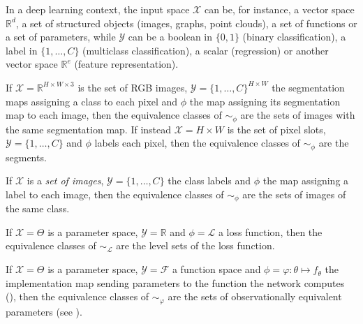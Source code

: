 \documentclass[mathematics,review,submit,moreauthors]{Definitions/mdpi}
\begin{document}
In a deep learning context, the input space $\mathcal{X}$ can be, for instance, a vector space $\mathbb{R}^d$, a set of structured objects (images, graphs, point clouds), a set of functions or a set of parameters, while $\mathcal{Y}$ can be a boolean in $\{0,1\}$ (binary classification), a label in $\{1,\dots,C\}$ (multiclass classification), a scalar (regression) or another vector space $\mathbb{R}^e$ (feature representation).

\begin{Example}\label{ex:image-segmentation}
    If $\mathcal{X}=\mathbb{R}^{H\times W\times 3}$ is the set of RGB images, $\mathcal{Y}=\{1,\dots,C\}^{H\times W}$ the segmentation maps assigning a class to each pixel and $\phi$ the map assigning its segmentation map to each image, then the equivalence classes of $\sim_\phi$ are the sets of images with the same segmentation map.
    If instead $\mathcal{X}=H\times W$ is the set of pixel slots, $\mathcal{Y} = \{1,\dots,C\}$ and $\phi$ labels each pixel, then the equivalence classes of $\sim_\phi$ are the segments.
\end{Example}

\begin{Example}\label{ex:image-classification}
    If $\mathcal{X}$ is a \emph{set of images}, $\mathcal{Y} = \{1,\dots,C\}$ the class labels and $\phi$ the map assigning a label to each image, then the equivalence classes of $\sim_\phi$ are the sets of images of the same class.
\end{Example}

\begin{Example}
    If $\mathcal{X}=\Theta$ is a parameter space, $\mathcal{Y} = \mathbb{R}$ and $\phi=\mathcal{L}$ a loss function, then the equivalence classes of $\sim_{\mathcal{L}}$ are the level sets of the loss function.
\end{Example}

\begin{Example}\label{ex:equivalence_observational}
    If $\mathcal{X}=\Theta$ is a parameter space, $\mathcal{Y}=\mathcal{F}$ a function space and $\phi=\varphi:\theta\mapsto f_\theta$ the implementation map sending parameters to the function the network computes (), then the equivalence classes of $\sim_\varphi$ are the sets of observationally equivalent parameters (see ).
\end{Example}
\end{document}
